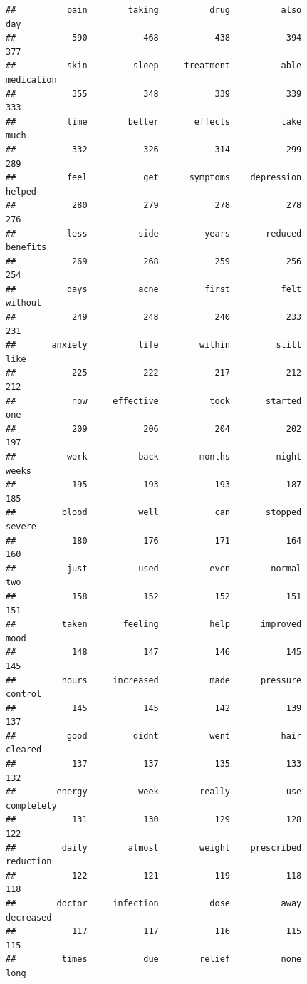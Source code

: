 \documentclass[spanish,]{article}
\begin{document}
\begin{verbatim}
##          pain        taking          drug          also           day 
##           590           468           438           394           377 
##          skin         sleep     treatment          able    medication 
##           355           348           339           339           333 
##          time        better       effects          take          much 
##           332           326           314           299           289 
##          feel           get      symptoms    depression        helped 
##           280           279           278           278           276 
##          less          side         years       reduced      benefits 
##           269           268           259           256           254 
##          days          acne         first          felt       without 
##           249           248           240           233           231 
##       anxiety          life        within         still          like 
##           225           222           217           212           212 
##           now     effective          took       started           one 
##           209           206           204           202           197 
##          work          back        months         night         weeks 
##           195           193           193           187           185 
##         blood          well           can       stopped        severe 
##           180           176           171           164           160 
##          just          used          even        normal           two 
##           158           152           152           151           151 
##         taken       feeling          help      improved          mood 
##           148           147           146           145           145 
##         hours     increased          made      pressure       control 
##           145           145           142           139           137 
##          good         didnt          went          hair       cleared 
##           137           137           135           133           132 
##        energy          week        really           use    completely 
##           131           130           129           128           122 
##         daily        almost        weight    prescribed     reduction 
##           122           121           119           118           118 
##        doctor     infection          dose          away     decreased 
##           117           117           116           115           115 
##         times           due        relief          none          long 

\end{verbatim}
\end{document}
